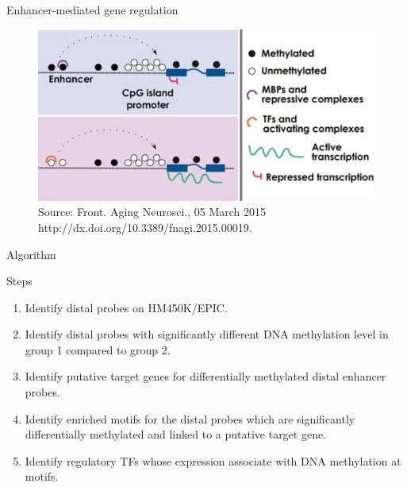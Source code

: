 \documentclass[slidestop,compress,11pt,xcolor=dvipsnames]{beamer}
\begin{document}
\begin{frame}{Enhancer-mediated gene regulation}
 \vspace*{-0.1cm}
 \begin{figure}
  \centering
  \includegraphics[width=1.0\linewidth]{ELMER/dna_met.png}{\tiny{\\Source: Front. Aging Neurosci., 05 March 2015 http://dx.doi.org/10.3389/fnagi.2015.00019.}}
 \end{figure}
\end{frame}




\begin{frame}{Algorithm}

\begin{exampleblock}{Steps}
\begin{enumerate}
\item  Identify distal probes on HM450K/EPIC.
\item  Identify distal probes with significantly different DNA methylation level in  group 1 compared to group 2.
\item  Identify putative target genes for differentially methylated distal enhancer probes.
\item  Identify enriched motifs for the distal  probes which are significantly differentially methylated and linked to a putative target gene.
\item  Identify regulatory TFs whose expression associate with DNA methylation at motifs.
\end{enumerate}

\end{exampleblock}
\end{frame}
\end{document}
